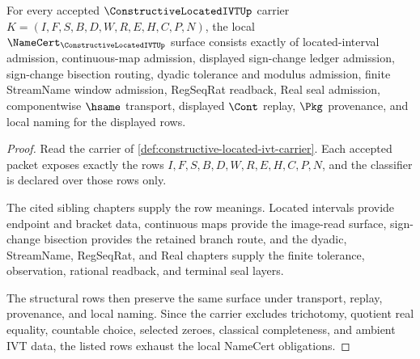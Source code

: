 \begin{theorem}
\label{thm:constructive-located-ivt-namecert-obligations}
For every accepted $\ConstructiveLocatedIVTUp$ carrier $K=(I,F,S,B,D,W,R,E,H,C,P,N)$, the local $\NameCert_{\ConstructiveLocatedIVTUp}$ surface consists exactly of located-interval admission, continuous-map admission, displayed sign-change ledger admission, sign-change bisection routing, dyadic tolerance and modulus admission, finite StreamName window admission, RegSeqRat readback, Real seal admission, componentwise $\hsame$ transport, displayed $\Cont$ replay, $\Pkg$ provenance, and local naming for the displayed rows.
\end{theorem}
\begin{proof}
Read the carrier of \autoref{def:constructive-located-ivt-carrier}. Each accepted packet exposes exactly the rows $I,F,S,B,D,W,R,E,H,C,P,N$, and the classifier is declared over those rows only.

The cited sibling chapters supply the row meanings. Located intervals provide endpoint and bracket data, continuous maps provide the image-read surface, sign-change bisection provides the retained branch route, and the dyadic, StreamName, RegSeqRat, and Real chapters supply the finite tolerance, observation, rational readback, and terminal seal layers.

The structural rows then preserve the same surface under transport, replay, provenance, and local naming. Since the carrier excludes trichotomy, quotient real equality, countable choice, selected zeroes, classical completeness, and ambient IVT data, the listed rows exhaust the local NameCert obligations.
\end{proof}

